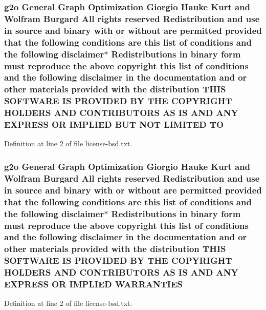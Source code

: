 \subsubsection[{\texorpdfstring{TO}{TO}}]{\setlength{\rightskip}{0pt plus 5cm}g2o General Graph Optimization Giorgio Hauke Kurt and Wolfram Burgard All rights reserved Redistribution and use in source and binary with or without are permitted provided that the following conditions are this list of conditions and the following disclaimer$\ast$ Redistributions in binary form must reproduce the above copyright this list of conditions and the following disclaimer in the documentation and or other materials provided with the distribution T\+H\+IS S\+O\+F\+T\+W\+A\+RE IS P\+R\+O\+V\+I\+D\+ED BY T\+HE C\+O\+P\+Y\+R\+I\+G\+HT H\+O\+L\+D\+E\+RS A\+ND C\+O\+N\+T\+R\+I\+B\+U\+T\+O\+RS AS IS A\+ND A\+NY E\+X\+P\+R\+E\+SS OR I\+M\+P\+L\+I\+ED B\+UT N\+OT L\+I\+M\+I\+T\+ED TO}\hypertarget{license-bsd_8txt_a3abe64e9d6972c3df3a932f316dfc926}{}\label{license-bsd_8txt_a3abe64e9d6972c3df3a932f316dfc926}


Definition at line 2 of file license-\/bsd.\+txt.

\subsubsection[{\texorpdfstring{W\+A\+R\+R\+A\+N\+T\+I\+ES}{WARRANTIES}}]{\setlength{\rightskip}{0pt plus 5cm}g2o General Graph Optimization Giorgio Hauke Kurt and Wolfram Burgard All rights reserved Redistribution and use in source and binary with or without are permitted provided that the following conditions are this list of conditions and the following disclaimer$\ast$ Redistributions in binary form must reproduce the above copyright this list of conditions and the following disclaimer in the documentation and or other materials provided with the distribution T\+H\+IS S\+O\+F\+T\+W\+A\+RE IS P\+R\+O\+V\+I\+D\+ED BY T\+HE C\+O\+P\+Y\+R\+I\+G\+HT H\+O\+L\+D\+E\+RS A\+ND C\+O\+N\+T\+R\+I\+B\+U\+T\+O\+RS AS IS A\+ND A\+NY E\+X\+P\+R\+E\+SS OR I\+M\+P\+L\+I\+ED W\+A\+R\+R\+A\+N\+T\+I\+ES}\hypertarget{license-bsd_8txt_aada97a6c44c9b8b4b0cfb3a641d0fe51}{}\label{license-bsd_8txt_aada97a6c44c9b8b4b0cfb3a641d0fe51}


Definition at line 2 of file license-\/bsd.\+txt.

